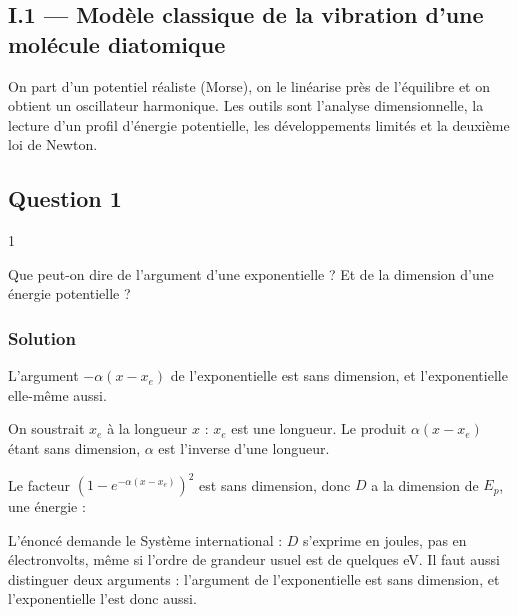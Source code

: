 \documentclass[11pt,a4paper]{article}
\newcommand{\equationajustee}[1]{%
  \sbox{\boiteequation}{$\displaystyle #1$}%
  \ifdim\wd\boiteequation>\linewidth
    \[\resizebox{\linewidth}{!}{\usebox{\boiteequation}}\]%
  \else
    \[#1\]%
  \fi}
\begin{document}
\hypertarget{i.1-moduxe8le-classique-de-la-vibration-dune-moluxe9cule-diatomique}{%
\subsection{I.1 --- Modèle classique de la vibration d'une molécule diatomique}\label{i.1-moduxe8le-classique-de-la-vibration-dune-moluxe9cule-diatomique}}

On part d'un potentiel réaliste (Morse), on le linéarise près de l'équilibre et on obtient un oscillateur harmonique. Les outils sont l'analyse dimensionnelle, la lecture d'un profil d'énergie potentielle, les développements limités et la deuxième loi de Newton.

\hypertarget{question-1}{%
\subsection{Question 1}\label{question-1}}

\begin{indication}{1}

Que peut-on dire de l'argument d'une exponentielle ? Et de la dimension d'une énergie potentielle ?

\end{indication}

\hypertarget{solution}{%
\subsubsection{Solution}\label{solution}}

L'argument \(-\alpha(x-x_e)\) de l'exponentielle est sans dimension, et l'exponentielle elle-même aussi.

On soustrait \(x_e\) à la longueur \(x\) : \(x_e\) est une longueur. Le produit \(\alpha(x-x_e)\) étant sans dimension, \(\alpha\) est l'inverse d'une longueur.

Le facteur \((1-e^{-\alpha(x-x_e)})^2\) est sans dimension, donc \(D\) a la dimension de \(E_p\), une énergie :
\equationajustee{\boxed{\begin{aligned}
D&\ \text{en J}=\text{kg·m}^2\text{·s}^{-2}\\
\alpha&\ \text{en m}^{-1}\\
x_e&\ \text{en m}
\end{aligned}}}

\begin{piege}

L'énoncé demande le Système international : \(D\) s'exprime en joules, pas en électronvolts, même si l'ordre de grandeur usuel est de quelques eV. Il faut aussi distinguer deux arguments : l'argument de l'exponentielle est sans dimension, et l'exponentielle l'est donc aussi.

\end{piege}
\end{document}
